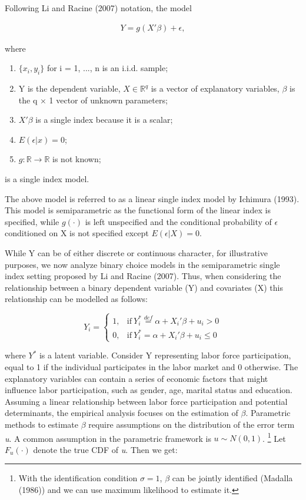 \documentclass[a4paper]{article}
\begin{document}
\vspace{2mm} 
Following Li and Racine (2007) notation, the model
 
\begin{eqnarray}
Y = g(X'\beta) + \epsilon,  %
\end{eqnarray}

where

\begin{enumerate}[label=(\roman*)]
		\item $\{x_i,y_i\}$ for i = 1, ..., n is an i.i.d. sample;
		\item Y is the dependent variable, $X\in \mathbb{R}^{q}$ is a vector of explanatory variables, $\beta$ is the q $\times$ 1 vector of unknown parameters; 
	\item $X'\beta$ is a single index because it is a scalar;
	\item $ E(\epsilon|x) = 0 $;
	\item $g: \mathbb{R} \rightarrow \mathbb{R} $ is not known; %
\end{enumerate}

is a single index model.
\vspace{2mm}

The above model is referred to as a linear single index model by Ichimura (1993). This model is semiparametric as the functional form of the linear index is specified, while $g(\cdot)$ is left unspecified and the conditional probability of $\epsilon$ conditioned on X is not specified except $ E(\epsilon|X) = 0 $. 

While Y can be of either discrete or continuous character, for illustrative purposes, we now analyze binary choice models in the semiparametric single index setting proposed by Li and Racine (2007). Thus, when considering the relationship between a binary dependent variable (Y) and covariates (X) this relationship can be modelled as follows:

\[
    Y_i = 
    \begin{cases}
      1, & \text{if}\ Y_i^* \stackrel{def}{=} \alpha + X_i'\beta + u_i > 0 \\
      0, & \text{if}\ Y_i^* = \alpha + X_i'\beta + u_i \leq 0
    \end{cases}
\]

where $Y^{*}$ is a latent variable.
Consider Y representing labor force participation, equal to 1 if the individual participates in the labor market and 0 otherwise. The explanatory variables can contain a series of economic factors that might influence labor participation, such as gender, age, marital status and education. Assuming a linear relationship between labor force participation and potential determinants, the empirical analysis focuses on the estimation of $\beta$.
Parametric methods to estimate $\beta$ require assumptions on the distribution of the error term \textit{u}. A common assumption in the parametric framework is $ u \sim N(0, 1)$. \footnote{With the identification condition $\sigma = 1$, $\beta$ can be jointly identified (Madalla (1986)) and we can use maximum likelihood to estimate it.}  Let $F_u(\cdot)$ denote the true CDF of \textit{u}. Then we get:
\end{document}
